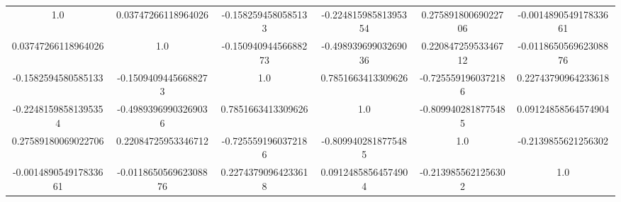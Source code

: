 \begin{tabular}{c | c | c | c | c | c}
1.0 & 0.03747266118964026 & -0.1582594580585133 & -0.22481598581395354 & 0.27589180069022706 & -0.001489054917833661 \\
0.03747266118964026 & 1.0 & -0.15094094456688273 & -0.49893969903269036 & 0.22084725953346712 & -0.011865056962308876 \\
-0.1582594580585133 & -0.15094094456688273 & 1.0 & 0.7851663413309626 & -0.7255591960372186 & 0.22743790964233618 \\
-0.22481598581395354 & -0.49893969903269036 & 0.7851663413309626 & 1.0 & -0.8099402818775485 & 0.09124858564574904 \\
0.27589180069022706 & 0.22084725953346712 & -0.7255591960372186 & -0.8099402818775485 & 1.0 & -0.2139855621256302 \\
-0.001489054917833661 & -0.011865056962308876 & 0.22743790964233618 & 0.09124858564574904 & -0.2139855621256302 & 1.0 \\
\end{tabular}